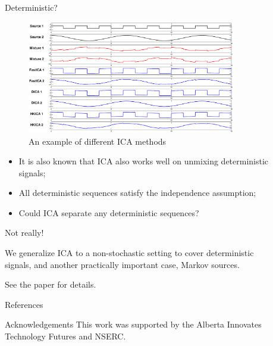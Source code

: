 \documentclass[final]{beamer} %
\begin{document}
\begin{frame}[c]
\begin{columns}[t,totalwidth=\textwidth]
	\begin{column}{0.01\textwidth}
	\end{column}
	\begin{column}{0.24\textwidth}
		\begin{block}{Deterministic?}
		\begin{figure}
		\includegraphics[width = 0.9\textwidth]{demo}
		\caption*{An example of different ICA methods}
		\end{figure} 
		
		\begin{itemize}
		\item It is also known that ICA also works well on unmixing deterministic signals;
		\item All deterministic sequences satisfy the independence assumption;
		\item Could ICA separate any deterministic sequences?
		\end{itemize}
		\begin{center}
		{\large Not really!}
		\end{center}
		We generalize ICA to a non-stochastic setting to cover deterministic signals, and another practically important case, Markov sources.
		
		See the paper for details.
		\end{block}
		\vspace{1ex}

		\begin{block}{References}
		\scriptsize
		
		
		\end{block}	
		\vspace{1ex}	
		\begin{block}{Acknowledgements}
		\scriptsize
		This work was supported by the Alberta Innovates Technology Futures and NSERC.
		\end{block}
		
	\end{column}
		
	\begin{column}{0.01\textwidth}
	\end{column}
\end{columns}
 
\end{frame}
\end{document}
